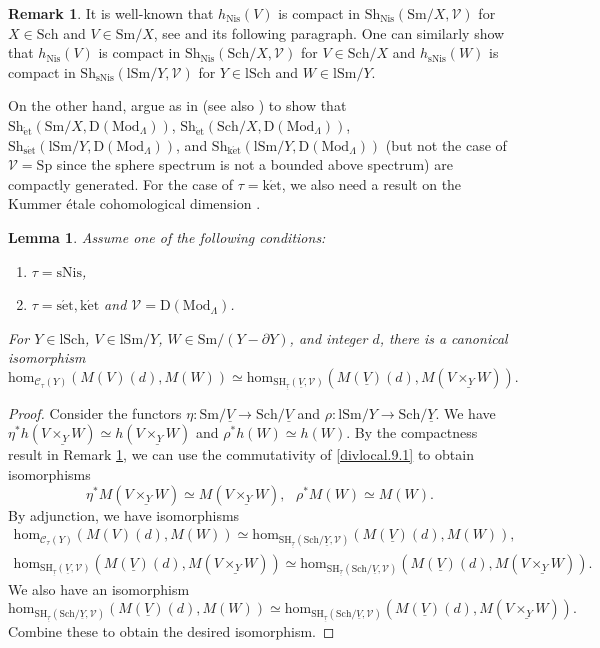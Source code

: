 \documentclass[10pt]{amsart}
\newtheorem{lem}[thm]{Lemma}
\theoremstyle{definition}
\newtheorem{rmk}[thm]{Remark}
\theoremstyle{remark}
\numberwithin{equation}{subsection}
\newcommand{\cV}{\mathcal{V}}
\newcommand{\sC}{\mathscr{C}}
\newcommand{\et}{\mathrm{\acute{e}t}}
\newcommand{\ul}{\underline}
\newcommand{\Spt}{\mathrm{Sp}}
\newcommand{\Sm}{\mathrm{Sm}}
\newcommand{\SH}{\mathrm{SH}}
\newcommand{\map}{\mathrm{hom}}
\newcommand{\DLambda}{\mathrm{D}(\mathrm{Mod}_{\Lambda})}
\newcommand{\Sch}{\mathrm{Sch}}
\newcommand{\lSch}{\mathrm{lSch}}
\newcommand{\lSm}{\mathrm{lSm}}
\newcommand{\infShv}{\mathrm{Sh}}
\newcommand{\sNis}{\mathrm{sNis}}
\newcommand{\ketale}{\mathrm{k\acute{e}t}}
\newcommand{\setale}{\mathrm{s\acute{e}t}}
\newcommand{\Nis}{\mathrm{Nis}}
\begin{document}
\begin{rmk}
\label{local.11}
It is well-known that $h_{\Nis}(V)$ is compact in $\infShv_{\Nis}(\Sm/X,\cV)$ for $X\in \Sch$ and $V\in \Sm/X$, see \cite[Proposition 4.5.62]{Ayo072} and its following paragraph.
One can similarly show that $h_{\Nis}(V)$ is compact in $\infShv_{\Nis}(\Sch/X,\cV)$ for $V\in \Sch/X$ and $h_{\sNis}(W)$ is compact in $\infShv_{\sNis}(\lSm/Y,\cV)$ for $Y\in \lSch$ and $W\in \lSm/Y$.

On the other hand,
argue as in \cite[Proposition 2.4.20(1)]{AGV} (see also \cite[Remark 2.4.23]{AGV}) to show that $\infShv_{\et}(\Sm/X,\DLambda)$, $\infShv_{\et}(\Sch/X,\DLambda)$, $\infShv_{\setale}(\lSm/Y,\DLambda)$, and $\infShv_{\ketale}(\lSm/Y,\DLambda)$ (but not the case of $\cV=\Spt$ since the sphere spectrum is not a bounded above spectrum) are compactly generated.
For the case of $\tau=\ketale$,
we also need a result on the Kummer \'etale cohomological dimension \cite[Proposition 5.3]{Nak}.
\end{rmk}


\begin{lem}
\label{local.2}
Assume one of the following conditions:
\begin{enumerate}
\item[\textup{(i)}]
$\tau=\sNis$,
\item[\textup{(ii)}]
$\tau=\setale,\ketale$ and $\cV=\DLambda$.
\end{enumerate}
For $Y\in \lSch$, $V\in \lSm/Y$, $W\in \Sm/(Y-\partial Y)$, and integer $d$,
there is a canonical isomorphism
\[
\map_{\sC_{\tau}(Y)}
(M(V)(d),M(W))
\simeq
\map_{\SH_{\ul{\tau}}(\ul{V},\cV)}
(M(\ul{V})(d),M(\ul{V\times_{Y}W})).
\]
\end{lem}
\begin{proof}
Consider the functors $\eta\colon \Sm/\ul{V}\to \Sch/\ul{V}$ and $\rho\colon \lSm/Y\to \Sch/\ul{Y}$.
We have $\eta^*h(\ul{V\times_Y W})\simeq h(\ul{V\times_Y W})$ and $\rho^*h(W)\simeq h(W)$.
By the compactness result in Remark \ref{local.11}, we can use the commutativity of \eqref{divlocal.9.1} to obtain isomorphisms
\[
\eta^*M(\ul{V\times_Y W})\simeq M(\ul{V\times_Y W}),
\text{ }
\rho^*M(W)\simeq M(W).
\]
By adjunction, we have isomorphisms
\begin{gather*}
\map_{\sC_{\tau}(Y)}
(M(V)(d),M(W))
\simeq
\map_{\SH_{\ul{\tau}}(\Sch/\ul{Y},\cV)}
(M(\ul{V})(d), M(W)),
\\
\map_{\SH_{\ul{\tau}}(\ul{V},\cV)}(M(\ul{V})(d),M(\ul{V\times_Y W}))
\simeq
\map_{\SH_{\ul{\tau}}(\Sch/\ul{V},\cV)}(M(\ul{V})(d),M(\ul{V\times_Y W})).
\end{gather*}
We also have an isomorphism
\[
\map_{\SH_{\ul{\tau}}(\Sch/\ul{Y},\cV)}(M(\ul{V})(d), M(W))
\simeq
\map_{\SH_{\ul{\tau}}(\Sch/\ul{V},\cV)}
(M(\ul{V})(d),M(\ul{V\times_Y W})).
\]
Combine these to obtain the desired isomorphism.
\end{proof}
\end{document}
